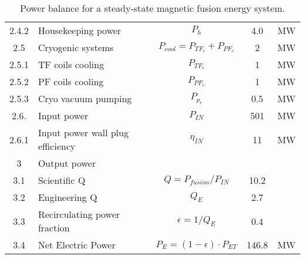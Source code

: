 \begin{table}[ht!]
\begin{tabular}{|c|p{5cm}|c|c|c|}
2.4.2	&	Housekeeping power	&	$P_{{h}}$	&	4.0	&	MW \\
2.5	&	Cryogenic systems	&	$P_{{cool}} = P_{{TF}_c} + P_{{PF}_c}$	&	2	&	MW \\
2.5.1	&	TF coils cooling	&	$P_{{TF}_c}$	&	1	&	MW \\
2.5.2	&	PF coils cooling	&	$P_{{PF}_c}$	&	1	&	MW \\
2.5.3	&	Cryo vacuum pumping	&	$P_{{p}_c}$	&	0.5	&	MW \\
2.6.	& Input power 	& $P_{IN}$	&	501	&	MW \\
2.6.1	& Input power wall plug efficiency  &	$\eta_{IN}$ & 11	&	MW \\
\hline								
3	&	Output power	&		&		&	\\
\hline
3.1	&	Scientific Q	&	$Q = P_{{fusion}}/P_{{IN}}$	&	10.2	&	\\
3.2	&	Engineering Q	&	$Q_{{E}}$	&	2.7	&	\\
3.3	&	Recirculating power fraction	&	$\epsilon = 1/Q_{{E}}$	&	0.4	&	\\
3.4	&	Net Electric Power	&	$P_{{E}} = (1 - \epsilon) \cdot P_{{ET}}$	&	146.8	&	MW \\
\hline								
\end{tabular}	
\caption{Power balance for a steady-state magnetic fusion energy system.}
\label{tab:powerbalance}
\end{table}





